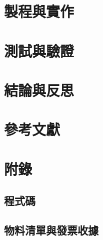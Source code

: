 \documentclass[12pt]{article}       %
\begin{document}

\section{\centering 製程與實作}
\hspace{2em}


\section{\centering 測試與驗證}
\hspace{2em}


\section{\centering 結論與反思}
\hspace{2em}






\section{\centering 參考文獻}
\vspace{-3.5em}  %
\renewcommand{\refname}{}  %

\section{\centering 附錄}

\subsection{程式碼} 
\hspace{2em}


\subsection{物料清單與發票收據} 
\hspace{2em}

\end{document}
